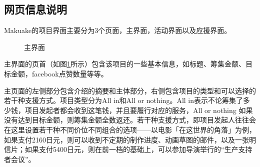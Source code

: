 \documentclass[lang=cn,a4paper]{elegantpaper}
\begin{document}
\subsection{网页信息说明}
Makuake的项目界面主要分为3个页面，主界面，活动界面以及应援界面。
\begin{figure}[!htbp]
  \centering
  \hspace{0 pt}
  \caption{主界面}
  \label{fig:main project}
\end{figure}

主界面的页首（如图\ref{fig:main project}所示）包含该项目的一些基本信息，如标题、筹集金额、目标金额，facebook点赞数量等等。

主页面的左侧部分包含介绍的摘要和主体部分，右侧包含项目的类型和可以选择的若干种支援方式。项目类型分为All in和All or nothing。All in表示不论筹集了多少钱，项目发起者都会收到这笔钱，并且要履行对应的服务，All or nothing 如果没有达到目标金额，则筹集金额全数返还。若干种支援方式，即项目发起人往往会在这里设置若干种不同价位不同组合的选项——以电影「在这世界的角落」为例，如果支付2160日元，则可以收到不定期的制作进度、动画草图的邮件，以及一张明信片；如果支付5400日元，则在前一档的基础上，可以参加导演举行的“生产支持者会议”。
\end{document}
